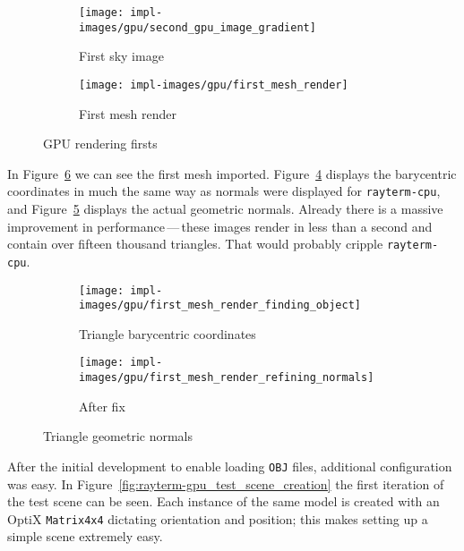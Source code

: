 \vspace{0.3em}
\begin{figure}[htb]
  \centering
  \begin{subfigure}[htb]{0.4\textwidth}
    \texttt{[image: impl-images/gpu/second\_gpu\_image\_gradient]}
    \caption{First sky image}
\label{fig:rayterm-gpu_first_rendered_image}
  \end{subfigure}
  \begin{subfigure}[htb]{0.4\textwidth}
    \texttt{[image: impl-images/gpu/first\_mesh\_render]}
    \caption{First mesh render}
\label{fig:rayterm-gpu_first_mesh_render}
  \end{subfigure}
  \caption{GPU rendering firsts}
\label{fig:rayterm-gpu_basics}
\end{figure}

In Figure~\ref{fig:rayterm-gpu_mesh} we can see the first mesh imported.
Figure~\ref{fig:rayterm-gpu_barycentric_coordinates} displays the barycentric coordinates in much the same way as normals were displayed for \texttt{rayterm-cpu}, and Figure~\ref{fig:rayterm-gpu_geometric_normals} displays the actual geometric normals.
Already there is a massive improvement in performance\,---\,these images render in less than a second and contain over fifteen thousand triangles.
That would probably cripple \texttt{rayterm-cpu}.

\vspace{0.3em}
\begin{figure}[htb]
  \centering
  \begin{subfigure}[htb]{0.45\textwidth}
    \texttt{[image: impl-images/gpu/first\_mesh\_render\_finding\_object]}
    \caption{Triangle barycentric coordinates}
\label{fig:rayterm-gpu_barycentric_coordinates}
  \end{subfigure}
  \begin{subfigure}[htb]{0.45\textwidth}
    \texttt{[image: impl-images/gpu/first\_mesh\_render\_refining\_normals]}
    \caption{After fix}
\label{fig:rayterm-gpu_geometric_normals}
  \end{subfigure}
  \caption{Triangle geometric normals}
\label{fig:rayterm-gpu_mesh}
\end{figure}

After the initial development to enable loading \texttt{OBJ} files, additional configuration was easy.
In Figure~\ref{fig:rayterm-gpu_test_scene_creation} the first iteration of the test scene can be seen.
Each instance of the same model is created with an OptiX \texttt{Matrix4x4} dictating orientation and position; this makes setting up a simple scene extremely easy.

